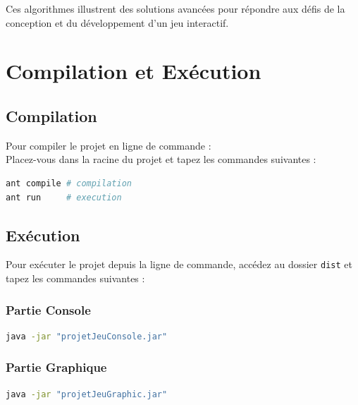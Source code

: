 \documentclass[12pt]{article}
\begin{document}
Ces algorithmes illustrent des solutions avancées pour répondre aux défis de la conception et du développement d'un jeu interactif.


\section{Compilation et Exécution}

\subsection{Compilation}
Pour compiler le projet en ligne de commande :\\
Placez-vous dans la racine du projet et tapez les commandes suivantes :
\begin{lstlisting}[language=Bash, frame=single]
ant compile # compilation
ant run     # execution
\end{lstlisting}

\subsection*{Exécution}
Pour exécuter le projet depuis la ligne de commande, accédez au dossier \texttt{dist} et tapez les commandes suivantes :

\subsubsection{Partie Console}
\begin{lstlisting}[language=Bash, frame=single]
java -jar "projetJeuConsole.jar"
\end{lstlisting}

\subsubsection{Partie Graphique}
\begin{lstlisting}[language=Bash, frame=single]
java -jar "projetJeuGraphic.jar"
\end{lstlisting}
\end{document}
